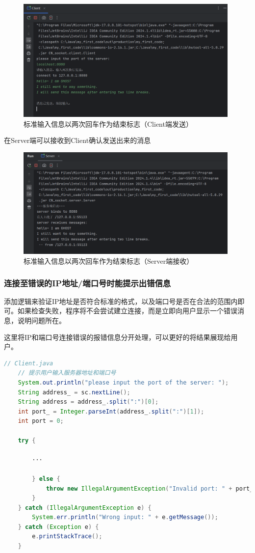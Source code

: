 \documentclass{article}
\begin{document}
	\begin{figure}[H]
		\centering
		\includegraphics[width=11cm]{./images/5.标准输入信息以两次回车作为结束标志-Client.png}
		\caption{标准输入信息以两次回车作为结束标志（Client端发送）}
	\end{figure}
	
	在Server端可以接收到Client确认发送出来的消息
	
	\begin{figure}[H]
		\centering
		\includegraphics[width=11cm]{./images/5.标准输入信息以两次回车作为结束标志-Server.png}
		\caption{标准输入信息以两次回车作为结束标志（Server端接收）}
	\end{figure}
	
	\subsubsection{连接至错误的IP地址/端口号时能提示出错信息}
	
	添加逻辑来验证IP地址是否符合标准的格式，以及端口号是否在合法的范围内即可。如果检查失败，程序将不会尝试建立连接，而是立即向用户显示一个错误消息，说明问题所在。
	
	这里将IP和端口号连接错误的报错信息分开处理，可以更好的将结果展现给用户。
	
	\begin{lstlisting}[language=Java, title=连接至错误的IP地址/端口号时能提示出错信息, tabsize=4]
	// Client.java
	// 提示用户输入服务器地址和端口号
	System.out.println("please input the port of the server: ");
	String address_ = sc.nextLine();
	String address = address_.split(":")[0];
	int port_ = Integer.parseInt(address_.split(":")[1]);
	int port = 0;
	
	try {
		
		···
		
		} else {
			throw new IllegalArgumentException("Invalid port: " + port_);
		}
	} catch (IllegalArgumentException e) {
		System.err.println("Wrong input: " + e.getMessage());
	} catch (Exception e) {
		e.printStackTrace();
	}
	\end{lstlisting}
	
\end{document}

